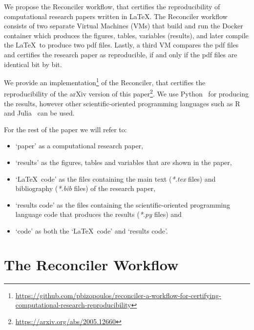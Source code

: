 \documentclass[journal]{IEEEtran}
\begin{document}
We propose the Reconciler workflow, that certifies the reproducibility of computational research papers written in \LaTeX.
The Reconciler workflow consists of two separate Virtual Machines (VMs) that build and run the Docker container which produces the figures, tables, variables (results), and later compile the \LaTeX\ to produce two pdf files.
Lastly, a third VM compares the pdf files and certifies the research paper as reproducible, if and only if the pdf files are identical bit by bit.

We provide an implementation\footnote{\url{https://github.com/pbizopoulos/reconciler-a-workflow-for-certifying-computational-research-reproducibility}} of the Reconciler, that certifies the reproducibility of the arXiv version of this paper\footnote{\url{https://arxiv.org/abs/2005.12660}}.
We use Python~\cite{van2007python} for producing the results, however other scientific-oriented programming languages such as R~\cite{ihaka1996r} and Julia~\cite{bezanson2017julia} can be used.

For the rest of the paper we will refer to:
\begin{itemize}
	\item `paper' as a computational research paper,
	\item `results' as the figures, tables and variables that are shown in the paper,
	\item `\LaTeX\ code' as the files containing the main text (\textit{*.tex} files) and bibliography (\textit{*.bib} files) of the research paper,
	\item `results code' as the files containing the scientific-oriented programming language code that produces the results (\textit{*.py} files) and
	\item `code' as both the `\LaTeX\ code' and `results code'.
\end{itemize}

\section{The Reconciler Workflow}
\end{document}

